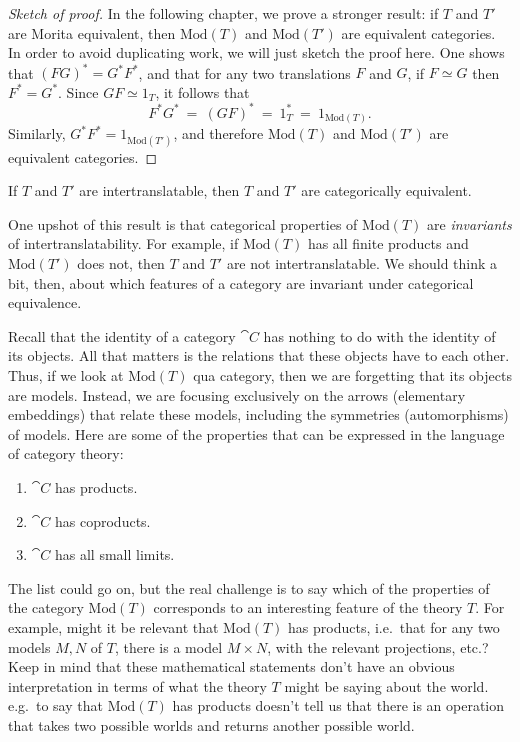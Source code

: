\begin{proof}[Sketch of proof] In the following chapter, we prove a
  stronger result: if $T$ and $T'$ are Morita equivalent, then
  $\mathrm{Mod}(T)$ and $\mathrm{Mod}(T')$ are equivalent categories.
  In order to avoid duplicating work, we will just sketch the proof
  here.  One shows that $(FG)^*=G^*F^*$, and that for any two
  translations $F$ and $G$, if $F\simeq G$ then $F^*=G^*$.  Since
  $GF\simeq 1_T$, it follows that
  \[ F^*G^* \: = \: (GF)^* \: = \:1_T^* \: = \: 1_{\mathrm{Mod}(T)}
    .\] Similarly, $G^*F^*=1_{\mathrm{Mod}(T')}$, and therefore
  $\mathrm{Mod}(T)$ and $\mathrm{Mod}(T')$ are equivalent categories.
\end{proof}

\begin{cor} If $T$ and $T'$ are intertranslatable, then $T$ and $T'$
  are categorically equivalent. \end{cor}

One upshot of this result is that categorical properties of
$\mathrm{Mod}(T)$ are \emph{invariants} of intertranslatability.  For
example, if $\mathrm{Mod}(T)$ has all finite products and
$\mathrm{Mod}(T')$ does not, then $T$ and $T'$ are not
intertranslatable.  We should think a bit, then, about which features
of a category are invariant under categorical equivalence.

Recall that the identity of a category $\cat{C}$ has nothing to do
with the identity of its objects.  All that matters is the relations
that these objects have to each other.  Thus, if we look at
$\mathrm{Mod}(T)$ qua category, then we are forgetting that its
objects are models.  Instead, we are focusing exclusively on the
arrows (elementary embeddings) that relate these models, including the
symmetries (automorphisms) of models.  Here are some of the properties
that can be expressed in the language of category theory:
\begin{enumerate}
\item $\cat{C}$ has products.
\item $\cat{C}$ has coproducts.
\item $\cat{C}$ has all small limits. \end{enumerate} The list could
go on, but the real challenge is to say which of the properties of the
category $\mathrm{Mod}(T)$ corresponds to an interesting feature of
the theory $T$.  For example, might it be relevant that
$\mathrm{Mod}(T)$ has products, i.e.\ that for any two models $M,N$ of
$T$, there is a model $M\times N$, with the relevant projections,
etc.?  Keep in mind that these mathematical statements don't have an
obvious interpretation in terms of what the theory $T$ might be saying
about the world.  e.g.\ to say that $\mathrm{Mod}(T)$ has products
doesn't tell us that there is an operation that takes two possible
worlds and returns another possible world.

